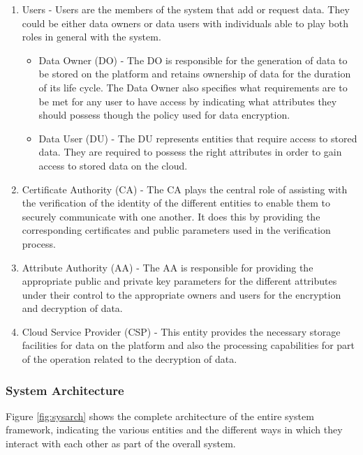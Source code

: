 \begin{enumerate}[label=(\arabic*)]
	\item Users - Users are the members of the system that add or request data. They could be either data owners or data users with individuals able to play both roles in general with the system.
	
	\begin{itemize}
		\item Data Owner (DO) - The DO is responsible for the generation of data to be stored on the platform and retains ownership of data for the duration of its life cycle. The Data Owner also specifies what requirements are to be met for any user to have access by indicating what attributes they should possess though the policy used for data encryption.
		
		\item Data User (DU) - The DU represents entities that require access to stored data. They are required to possess the right attributes in order to gain access to stored data on the cloud.
	\end{itemize}
	
	\item Certificate Authority (CA) - The CA plays the central role of assisting with the verification of the identity of the different entities to enable them to securely communicate with one another. It does this by providing the corresponding certificates and public parameters used in the verification process.
	
	\item Attribute Authority (AA) - The AA is responsible for providing the appropriate public and private key parameters for the different attributes under their control to the appropriate owners and users for the encryption and decryption of data. 
	
	\item Cloud Service Provider (CSP) - This entity provides the necessary storage facilities for data on the platform and also the processing capabilities for part of the operation related to the decryption of data.
	
\end{enumerate}

\subsubsection{System Architecture}

Figure \ref{fig:sysarch} shows the complete architecture of the entire system framework, indicating the various entities and the different ways in which they interact with each other as part of the overall system.



